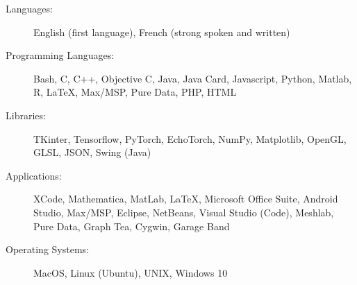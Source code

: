 \documentclass[letterpaper,11pt]{article}
\begin{document}
\begin{description}
\item[Languages:]
English (first language), French (strong spoken and written)

\item[Programming Languages:]
Bash, C, C++, Objective C, Java, Java Card, Javascript, Python, Matlab, R, \LaTeX, Max/MSP, Pure Data, PHP, HTML

\item[Libraries:]
TKinter, Tensorflow, PyTorch, EchoTorch, NumPy, Matplotlib, OpenGL, GLSL, JSON, Swing (Java)

\item[Applications:]
XCode, Mathematica, MatLab, \LaTeX, Microsoft Office Suite, Android Studio, Max/MSP, Eclipse, NetBeans, Visual Studio (Code), Meshlab, Pure Data, Graph Tea, Cygwin, Garage Band

\item[Operating Systems:]
MacOS, Linux (Ubuntu), UNIX, Windows 10
\end{description}
\end{document}
